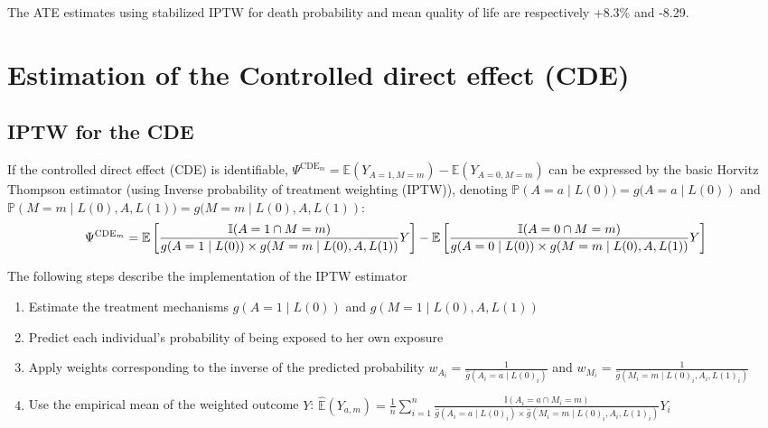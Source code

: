 \documentclass[
]{book}
\begin{document}
The ATE estimates using stabilized IPTW for death probability and mean quality of life are respectively +8.3\% and -8.29.

\hypertarget{estimation-of-the-controlled-direct-effect-cde}{%
\section{Estimation of the Controlled direct effect (CDE)}\label{estimation-of-the-controlled-direct-effect-cde}}

\hypertarget{iptw-for-the-cde}{%
\subsection{IPTW for the CDE}\label{iptw-for-the-cde}}

If the controlled direct effect (CDE) is identifiable, \(\Psi^{\text{CDE}_m} = \mathbb{E}(Y_{A=1,M=m}) - \mathbb{E}(Y_{A=0,M=m})\) can be expressed by the basic Horvitz Thompson estimator (using Inverse probability of treatment weighting (IPTW)), denoting \(\mathbb{P}\left(A=a \mid L(0)) = g(A=a \mid L(0)\right)\) and \(\mathbb{P}\left(M=m \mid L(0),A,L(1)) = g(M=m \mid L(0),A,L(1)\right)\):
\begin{equation}
\small
\Psi^{\text{CDE}_m} = \mathbb{E}\left[ \frac{\mathbb{I}(A=1 \cap M=m)}{g(A=1 \mid L(0)) \times g(M=m \mid L(0),A,L(1))} Y \right] - \mathbb{E}\left[ \frac{\mathbb{I}(A=0 \cap M=m)}{g(A=0 \mid L(0)) \times g(M=m \mid L(0),A,L(1))} Y \right]
\end{equation}

The following steps describe the implementation of the IPTW estimator

\begin{enumerate}
\def\labelenumi{\arabic{enumi}.}
\item
  Estimate the treatment mechanisms \(g\left(A=1 \mid L(0)\right)\) and \(g\left(M=1 \mid L(0),A,L(1)\right)\)
\item
  Predict each individual's probability of being exposed to her own exposure
\item
  Apply weights corresponding to the inverse of the predicted probability \(w_{A_i} = \frac{1}{\hat{g}(A_i = a \mid L(0)_i)}\) and \(w_{M_i} = \frac{1}{\hat{g}(M_i = m \mid L(0)_i,A_i,L(1)_i)}\)
\item
  Use the empirical mean of the weighted outcome \(Y\): \(\hat{\mathbb{E}}(Y_{a,m}) = \frac{1}{n} \sum_{i=1}^n \frac{\mathbb{I}(A_i=a \cap M_i=m)}{\hat{g}(A_i=a \mid L(0)_i) \times \hat{g}(M_i=m \mid L(0)_i,A_i,L(1)_i)} Y_i\)
\end{enumerate}
\end{document}
